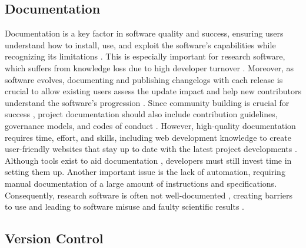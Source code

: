 \documentclass{article}
\begin{document}
\subsection{Documentation}

Documentation is a key factor in software quality and success, ensuring users understand how to install, use, and exploit the software's capabilities while recognizing its limitations \cite{10SimpleRulesForOpenDevOfSciSoft, BestPracticesForSciComp, GoodEnoughPracticesInSciComp, WhatMakesCompSoftSuccessful, SciSoftDevIsNotOxymoron, NamingThePainInDevSciSoft, CompSciError, BarelySufficientPracticesInSciComp}. This is especially important for research software, which suffers from knowledge loss due to high developer turnover \cite{RecommendOnResearchSoftware, EmpStudyDesignInHPC, SoftwareSustainabilityInstitute}. Moreover, as software evolves, documenting and publishing changelogs with each release is crucial to allow existing users assess the update impact and help new contributors understand the software's progression \cite{ELIXIRSoftwareManagementPlan, GoodEnoughPracticesInSciComp, SustainableResearchSoftwareHandOver}. Since community building is crucial for success \cite{WhatMakesCompSoftSuccessful, HowToSupportOpenSource}, project documentation should also include contribution guidelines, governance models, and codes of conduct \cite{SurveySEPracticesInScience, BestPracticesForSciComp, BestPracticesInBioinfSoftware, SustainableResearchSoftwareHandOver, 4SimpleRecs, ELIXIRSoftwareManagementPlan, DLRSoftEngGuidelines, NLeScienceSoftDevGuide}. However, high-quality documentation requires time, effort, and skills, including web development knowledge to create user-friendly websites that stay up to date with the latest project developments \cite{SurveySEPracticesInScience, WhatMakesCompSoftSuccessful}. Although tools exist to aid documentation \cite{TenSimpleRulesForDocumentingSciSoft, WhatMakesCompSoftSuccessful, BestPracticesForSciComp}, developers must still invest time in setting them up. Another important issue is the lack of automation, requiring manual documentation of a large amount of instructions and specifications. Consequently, research software is often not well-documented \cite{SoftEngForCompSci, ProblemsOfEndUserDevs, AnalyzingGitHubRepoOfPapers, DealingWithRiskInSciSoft}, creating barriers to use and leading to software misuse and faulty scientific results \cite{HowScientistsReallyUseComputers, HowScientistsDevSciSoftExternalRepl, CompSciError}.

\subsection{Version Control}
\end{document}

